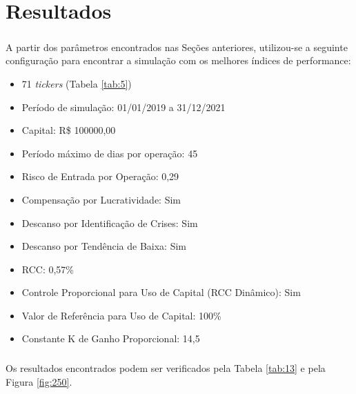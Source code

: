 \chapter{Resultados}
\label{cap4}



\paragraph{} A partir dos parâmetros encontrados nas Seções anteriores, utilizou-se a seguinte configuração para encontrar a simulação com os melhores índices de performance:

\begin{itemize}
    \item 71 \textit{tickers} (Tabela \ref{tab:5})
    \item Período de simulação: 01/01/2019 a 31/12/2021
    \item Capital: R\$ 100000,00
    \item Período máximo de dias por operação: 45
    \item Risco de Entrada por Operação: 0,29
    \item Compensação por Lucratividade: Sim
    \item Descanso por Identificação de Crises: Sim
    \item Descanso por Tendência de Baixa: Sim
    \item RCC: 0,57\%
    \item Controle Proporcional para Uso de Capital (RCC Dinâmico): Sim
    \item Valor de Referência para Uso de Capital: 100\%
    \item Constante K de Ganho Proporcional: 14,5
\end{itemize}

\paragraph{} Os resultados encontrados podem ser verificados pela Tabela \ref{tab:13} e pela Figura \ref{fig:250}.

